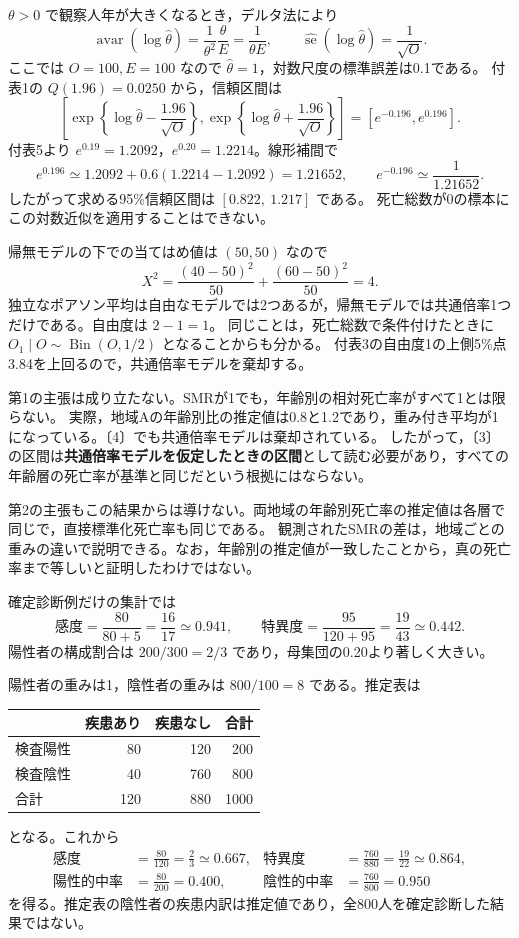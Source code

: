 \documentclass[a4paper,11pt]{ltjsarticle}
\begin{document}
$\theta>0$ で観察人年が大きくなるとき，デルタ法により
\[
\operatorname{avar}(\log\hat\theta)=\frac1{\theta^2}\frac\theta E=\frac1{\theta E},\qquad
\widehat{\operatorname{se}}(\log\hat\theta)=\frac1{\sqrt O}.
\]
ここでは $O=100,E=100$ なので $\hat\theta=1$，対数尺度の標準誤差は0.1である。
付表1の $Q(1.96)=0.0250$ から，信頼区間は
\[
\left[\exp\left\{\log\hat\theta-\frac{1.96}{\sqrt O}\right\},
\exp\left\{\log\hat\theta+\frac{1.96}{\sqrt O}\right\}\right]
=[e^{-0.196},e^{0.196}].
\]
付表5より $e^{0.19}=1.2092$，$e^{0.20}=1.2214$。線形補間で
\[
e^{0.196}\simeq1.2092+0.6(1.2214-1.2092)=1.21652,
\qquad e^{-0.196}\simeq\frac1{1.21652}.
\]
したがって求める95\%信頼区間は $\boxed{[0.822,\ 1.217]}$ である。
死亡総数が0の標本にこの対数近似を適用することはできない。

帰無モデルの下での当てはめ値は $(50,50)$ なので
\[
X^2=\frac{(40-50)^2}{50}+\frac{(60-50)^2}{50}=\boxed{4}.
\]
独立なポアソン平均は自由なモデルでは2つあるが，帰無モデルでは共通倍率1つだけである。自由度は $2-1=1$。
同じことは，死亡総数で条件付けたときに $O_1\mid O\sim\operatorname{Bin}(O,1/2)$ となることからも分かる。
付表3の自由度1の上側5\%点3.84を上回るので，共通倍率モデルを棄却する。

第1の主張は成り立たない。SMRが1でも，年齢別の相対死亡率がすべて1とは限らない。
実際，地域Aの年齢別比の推定値は0.8と1.2であり，重み付き平均が1になっている。〔4〕でも共通倍率モデルは棄却されている。
したがって，〔3〕の区間は\textbf{共通倍率モデルを仮定したときの区間}として読む必要があり，すべての年齢層の死亡率が基準と同じだという根拠にはならない。

第2の主張もこの結果からは導けない。両地域の年齢別死亡率の推定値は各層で同じで，直接標準化死亡率も同じである。
観測されたSMRの差は，地域ごとの重みの違いで説明できる。なお，年齢別の推定値が一致したことから，真の死亡率まで等しいと証明したわけではない。
\newpage

確定診断例だけの集計では
\[
\text{感度}=\frac{80}{80+5}=\boxed{\frac{16}{17}\simeq0.941},\qquad
\text{特異度}=\frac{95}{120+95}=\boxed{\frac{19}{43}\simeq0.442}.
\]
陽性者の構成割合は $200/300=2/3$ であり，母集団の0.20より著しく大きい。

陽性者の重みは1，陰性者の重みは $800/100=8$ である。推定表は
\begin{center}
\begin{tabular}{lrrr}
\toprule
 & 疾患あり & 疾患なし & 合計\\
\midrule
検査陽性 & 80 & 120 & 200\\
検査陰性 & 40 & 760 & 800\\
\midrule
合計 & 120 & 880 & 1000\\
\bottomrule
\end{tabular}
\end{center}
となる。これから
\begin{align*}
\text{感度}&=\frac{80}{120}=\boxed{\frac23\simeq0.667},&
\text{特異度}&=\frac{760}{880}=\boxed{\frac{19}{22}\simeq0.864},\\
\text{陽性的中率}&=\frac{80}{200}=\boxed{0.400},&
\text{陰性的中率}&=\frac{760}{800}=\boxed{0.950}
\end{align*}
を得る。推定表の陰性者の疾患内訳は推定値であり，全800人を確定診断した結果ではない。
\end{document}
